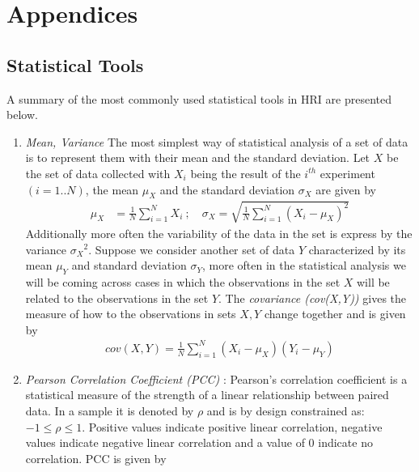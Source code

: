 
\chapter{Appendices}
\label{AppendixA}

\section{Statistical Tools} %
\label{appendix:stat_tools}
	A summary of the most commonly used statistical tools in HRI are presented below.
\begin{enumerate}
\item \emph{Mean, Variance} The most simplest way of statistical analysis of a set of data is to represent them with their mean and the standard deviation. Let $X$ be the set of data collected with $X_i$ being the result of the $i^{th}$ experiment $(i = 1..N)$, the mean $\mu_X$ and the standard deviation $\sigma_X$ are given by
\begin{align*}
\mu_X    &= \frac{1}{N} \sum_{i=1}^{N} X_i\ ; \quad \sigma_X = \sqrt{\frac{1}{N} \sum_{i=1}^{N} (X_i - \mu_X)^2}
\end{align*}
Additionally more often the variability of the data in the set is express by the variance ${\sigma_X}^2$. Suppose we consider another set of data $Y$ characterized by its mean $\mu_Y$ and standard deviation $\sigma_Y$, more often in the statistical analysis we will be coming across cases in which the observations in the set $X$ will be related to the observations in the set $Y$. The \emph{covariance (cov(X,Y))} gives the measure of how to the observations in sets $X,Y$ change together and is given by
\begin{align*}
cov(X,Y) = \frac{1}{N} \sum_{i=1}^{N} (X_i - \mu_X) (Y_i - \mu_Y) 
\end{align*}
\item \emph{Pearson Correlation Coefficient (PCC)} : Pearson’s correlation coefficient is a statistical measure of the strength of a linear relationship between paired data. In a sample it is denoted by $\rho$ and is by design constrained as: $-1 \leq \rho \leq 1$. Positive values indicate positive linear correlation, negative values indicate negative linear correlation and a value of 0 indicate no correlation. PCC is given by
\begin{equation}

\end{equation}
\end{enumerate}
